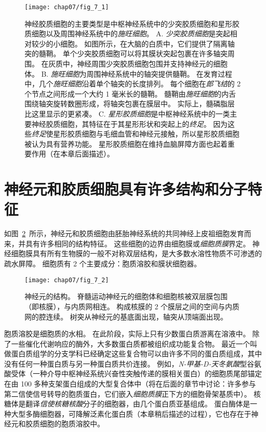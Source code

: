 \begin{figure}[htbp]
	\centering
	\texttt{[image: chap07/fig\_7\_1]}
	\caption{神经胶质细胞的主要类型是中枢神经系统中的少突胶质细胞和星形胶质细胞以及周围神经系统中的\textit{施旺细胞}。
		A. \textit{少突胶质细胞}是突起相对较少的小细胞。
		如图所示，在大脑的白质中，它们提供了隔离轴突的髓鞘。
		单个少突胶质细胞可以将其膜状突起包裹在许多轴突周围。
		在灰质中，神经周围少突胶质细胞包围并支持神经元的细胞体。
		B. \textit{施旺细胞}为周围神经系统中的轴突提供髓鞘。
		在发育过程中，几个\textit{施旺细胞}沿着单个轴突的长度排列。
		每个细胞在\textit{郎飞结}的 2 个节点之间形成一个大约 1 毫米长的髓鞘。
		髓鞘由\textit{施旺细胞}的内舌围绕轴突旋转数圈形成，将轴突包裹在膜层中。
		实际上，髓磷脂层比这里显示的更紧凑。
		C. \textit{星形胶质细胞}是中枢神经系统中的一类主要神经胶质细胞，其特征在于其星形形状和突起上的\textit{终足}。
		因为这些\textit{终足}使星形胶质细胞与毛细血管和神经元接触，所以星形胶质细胞被认为具有营养功能。
		星形胶质细胞在维持血脑屏障方面也起着重要作用（在本章后面描述）。}
	\label{fig:7_1}
\end{figure}


\section{神经元和胶质细胞具有许多结构和分子特征}

如图~\ref{fig:7_2}~所示，神经元和胶质细胞由胚胎神经系统的共同神经上皮祖细胞发育而来，并具有许多相同的结构特征。
这些细胞的边界由细胞膜或\textit{细胞质膜}界定。
神经细胞膜具有所有生物膜的一般不对称双层结构，是大多数水溶性物质不可渗透的疏水屏障。
细胞质有 2 个主要成分：胞质溶胶和膜状细胞器。


\begin{figure}[htbp]
	\centering
	\texttt{[image: chap07/fig\_7\_2]}
	\caption{神经元的结构。
		脊髓运动神经元的细胞体和细胞核被双层膜包围（即核膜），与内质网相连。
		构成核膜的 2 个膜层之间的空间与内质网的腔连续。
		树突从神经元的基底面出现，轴突从顶端面出现\cite{williams1989bannister}。}
	\label{fig:7_2}
\end{figure}


胞质溶胶是细胞质的水相。
在此阶段，实际上只有少数蛋白质游离在溶液中。
除了一些催化代谢响应的酶外，大多数蛋白质都被组织成功能复合物。
最近一个叫做蛋白质组学的分支学科已经确定这些复合物可以由许多不同的蛋白质组成，其中没有任何一种蛋白质与另一种蛋白质共价连接。
例如，\textit{N-甲基-D-天冬氨酸}型谷氨酸受体（一种介导中枢神经系统兴奋性突触传递的膜相关蛋白）的细胞质尾部锚定在由 100 多种支架蛋白组成的大型复合体中（将在后面的章节中讨论：许多参与第二信使信号转导的胞质蛋白，它们嵌入\textit{细胞质膜}正下方的细胞骨架基质中）。
核糖体是翻译\textit{信使核糖核酸}分子的细胞器，由几个蛋白质亚基组成。
蛋白酶体是一种大型多酶细胞器，可降解泛素化蛋白质（本章稍后描述的过程），它也存在于神经元和胶质细胞的胞质溶胶中。


